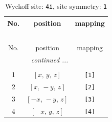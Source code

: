 \documentclass[fleqn,8pt]{jsarticle}
\begin{document}
\begin{longtable}{ccc}
\caption{Wyckoff site: {\tt 4i}, site symmetry: {\tt 1}}
 \\
 \hline \hline
No. & position & mapping \\ \hline \endfirsthead

\multicolumn{2}{l}{\tablename\ \thetable{}} \\
 \hline \hline
No. & position & mapping \\ \hline \endhead

 \hline \hline
\multicolumn{2}{r}{\footnotesize\it continued ...} \\ \endfoot

 \hline \hline
\multicolumn{2}{r}{} \\ \endlastfoot

1 & $\left[ x,\, y,\, z \right]$ & {\tt [1]} \\ \hline
2 & $\left[ x,\, - y,\, z \right]$ & {\tt [2]} \\ \hline
3 & $\left[ - x,\, - y,\, z \right]$ & {\tt [3]} \\ \hline
4 & $\left[ - x,\, y,\, z \right]$ & {\tt [4]} \\
\end{longtable}
\end{document}
